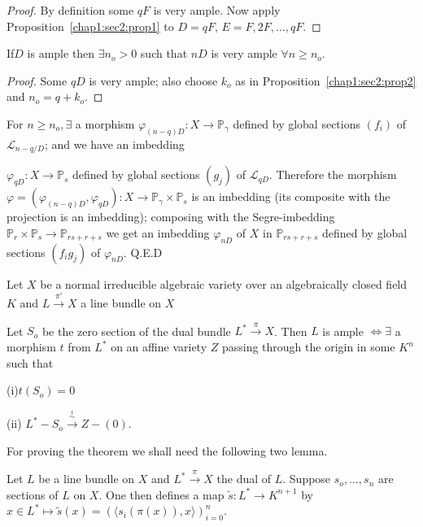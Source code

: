 {\begin{proof}%
  By definition some $q{F}$ is very ample. Now apply
  Proposition~\ref{chap1:sec2:prop1} to $D
  = q{F},\, E = F, 2F, \ldots, qF$. 
\end{proof}

\begin{proposition}\label{chap1:sec2:prop3}%
  If\pageoriginale $D$ is ample then $\exists n_{o} > 0$ such that $nD$ is very
  ample $\forall n \ge n_{o}$.  
\end{proposition}

\begin{proof}%
  Some $qD$ is very ample; also choose $k_{o}$ as in
  Proposition~\ref{chap1:sec2:prop2} 
  and $n_{o} = q+k_{o}$. 
\end{proof}

For $n \ge n_{o}, \exists $ a morphism $\varphi_{(n-q)D}: X \to
\mathbb{P}_{\gamma}$ defined by global sections $(f_{i})$ of
$\mathscr{L}_{n-q/D} $; and we have an imbedding  

$\varphi_{qD}: X \to \mathbb{P}_{s}$ defined by global sections
$(g_{j})$ of $\mathscr{L}_{qD}$. Therefore the morphism $\varphi =
(\varphi_{(n-q)D}, \varphi_{qD}): X \to \mathbb{P}_{\gamma} \times
\mathbb{P}_{s}$ is an imbedding (its composite with the projection is
an imbedding); composing with the Segre-imbedding $\mathbb{P}_{r}
\times \mathbb{P}_{s} \to \mathbb{P}_{rs+r+s}$ we get an imbedding
$\varphi_{nD}$ of $X$ in $\mathbb{P}_{rs+r+s}$ defined by global
sections $(f_{i}g_{j})$ of $\varphi_{nD}$.  
\hfill {Q.E.D}

\begin{theorem*}[(Grauert)]%
  Let $X$ be a normal irreducible algebraic variety over an
  algebraically closed field $K$ and $L \xrightarrow{\pi'} X$ a line
  bundle on $X$ 

  Let $S_{o}$ be the zero section of the dual bundle $L^{*}
  \xrightarrow{\pi} X$. Then $L$ is ample $\Longleftrightarrow \exists$ 
  a morphism $t$ from $L^{*}$ on an affine variety $Z$ passing through
  the origin in some $K^{n}$ such that    
  
 {\rm (i)}\quad  $t(S_{o}) = 0$
  
 {\rm (ii)} \quad  $L^{*}- S_{o} \xrightarrow{\overset{t}{\sim}} Z - (0)$.
\end{theorem*}

For proving the theorem we shall need the following two lemma.

\begin{lemma}\label{chap1:sec2:lem1}%
  Let $L$ be a line bundle on $X$ and $L^{*} \xrightarrow{\pi} X $ the
  dual of $L$. Suppose $s_{o},\ldots,s_{n}$ are sections of $L$ on
  $X$. One then defines a map $\tilde{s}: L^{*} \to K^{n+1}$ by $x \in
  L^{*} \mapsto \tilde{s} (x) = ( \langle s_{i} (\pi(x)), x\rangle)_{i=0}^{n}$. 
\end{lemma}

}
